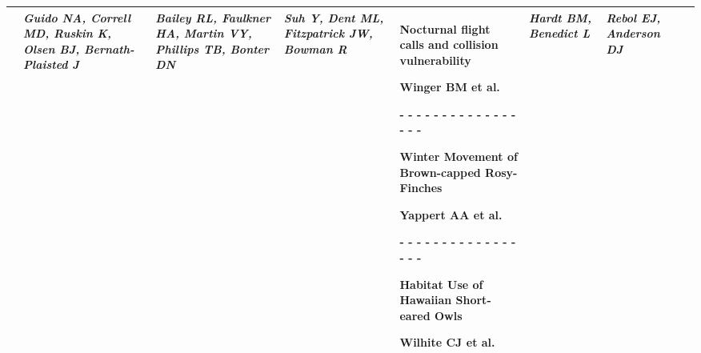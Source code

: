 \begin{tabular}{|x{0.8cm}|x{2.65cm}|x{2.65cm}|x{2.65cm}|x{2.65cm}|x{2.65cm}|x{2.65cm}|@{}m{0pt}@{}}
& \par \vspace{8pt} \textit{Guido NA, Correll MD, Ruskin K, Olsen BJ, Bernath-Plaisted J} &  \par \vspace{8pt} \textit{Bailey RL, Faulkner HA, Martin VY, Phillips TB, Bonter DN} &  \par \vspace{8pt} \textit{Suh Y, Dent ML, Fitzpatrick JW, Bowman R} & \scriptsize Nocturnal flight calls and collision vulnerability\par \tiny Winger BM et al. \par - - - - - - - - - - - - - - - - - \par \vspace{2pt} \scriptsize Winter Movement of Brown-capped Rosy-Finches\par \tiny Yappert AA et al. \par - - - - - - - - - - - - - - - - - \par \vspace{2pt} \scriptsize Habitat Use of Hawaiian Short-eared Owls\par \tiny Wilhite CJ et al.  &  \par \vspace{8pt} \textit{Hardt BM, Benedict L} &  \par \vspace{8pt} \textit{Rebol EJ, Anderson DJ}&\\[25ex]
\hline

\end{tabular}
